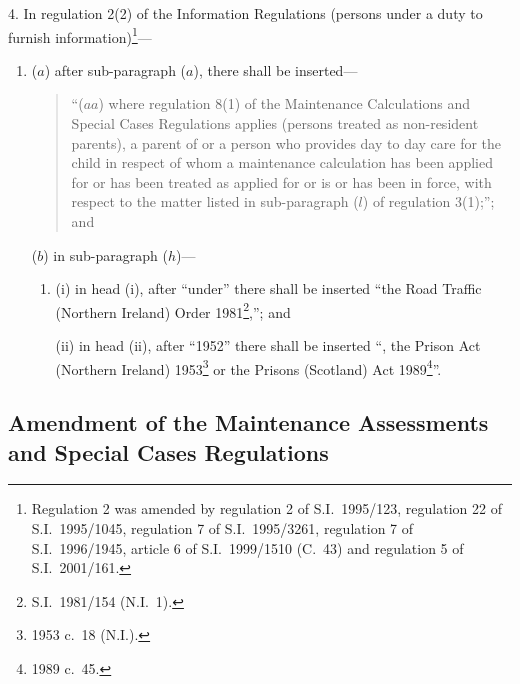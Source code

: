 \documentclass[12pt,a4paper]{article}
\begin{document}
4.  In regulation 2(2) of the Information Regulations (persons under a duty to furnish information)\footnote{Regulation 2 was amended by regulation 2 of S.I.\ 1995/123, regulation 22 of S.I.\ 1995/1045, regulation 7 of S.I.\ 1995/3261, regulation 7 of S.I.\ 1996/1945, article 6 of S.I.\ 1999/1510 (C.\ 43) and regulation 5 of S.I.\ 2001/161.}—
\begin{enumerate}\item[]
($a$) after sub-paragraph ($a$), there shall be inserted—
\begin{quotation}
“($aa$) where regulation 8(1) of the Maintenance Calculations and Special Cases Regulations applies (persons treated as non-resident parents), a parent of or a person who provides day to day care for the child in respect of whom a maintenance calculation has been applied for or has been treated as applied for or is or has been in force, with respect to the matter listed in sub-paragraph ($l$) of regulation 3(1);”; and
\end{quotation}

($b$) in sub-paragraph ($h$)—
\begin{enumerate}\item[]
(i) in head (i), after “under” there shall be inserted “the Road Traffic (Northern Ireland) Order 1981\footnote{S.I.\ 1981/154 (N.I.\ 1).},”; and

(ii) in head (ii), after “1952” there shall be inserted “, the Prison Act (Northern Ireland) 1953\footnote{1953 c.\ 18 (N.I.).} or the Prisons (Scotland) Act 1989\footnote{1989 c.\ 45.}”.
\end{enumerate}
\end{enumerate}

\subsection[5. Amendment of the Maintenance Assessments and Special Cases Regulations]{\sloppy Amendment of the Maintenance Assessments and Special Cases Regulations}
\end{document}
